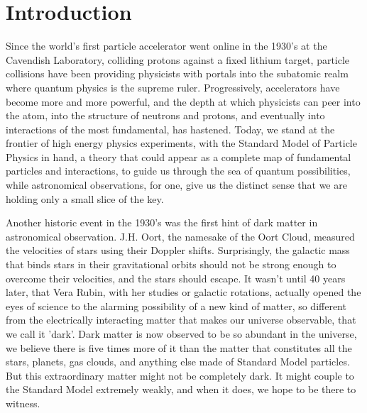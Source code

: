 \chapter{Introduction}

Since the world's first particle accelerator went online in the 1930's at the Cavendish Laboratory, colliding protons against a fixed lithium target, particle collisions have been providing physicists with portals into the subatomic realm where quantum physics is the supreme ruler.  Progressively, accelerators have become more and more powerful, and the depth at which physicists can peer into the atom, into the structure of neutrons and protons, and eventually into interactions of the most fundamental, has hastened.  Today, we stand at the frontier of high energy physics experiments, with the Standard Model of Particle Physics in hand, a theory that could appear as a complete map of fundamental particles and interactions, to guide us through the sea of quantum possibilities, while astronomical observations, for one, give us the distinct sense that we are holding only a small slice of the key.  

Another historic event in the 1930's was the first hint of dark matter in astronomical observation.  J.H. Oort, the namesake of the Oort Cloud, measured the velocities of stars using their Doppler shifts.  Surprisingly, the galactic mass that binds stars in their gravitational orbits should not be strong enough to overcome their velocities, and the stars should escape.  It wasn't until 40 years later, that Vera Rubin, with her studies or galactic rotations, actually opened the eyes of science to the alarming possibility of a new kind of matter, so different from the electrically interacting matter that makes our universe observable, that we call it 'dark'.  Dark matter is now observed to be so abundant in the universe, we believe there is five times more of it than the matter that constitutes all the stars, planets, gas clouds, and anything else made of Standard Model particles.  But this extraordinary matter might not be completely dark.  It might couple to the Standard Model extremely weakly, and when it does, we hope to be there to witness.


